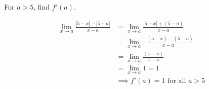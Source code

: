 \documentclass[nooutcomes]{ximera}
\renewenvironment{freeResponse}{
\ifhandout\setbox0\vbox\bgroup\else
\begin{trivlist}\item[\hskip \labelsep\bfseries Solution:\hspace{2ex}]
\fi}
{\ifhandout\egroup\else
\end{trivlist}
\fi}
\begin{document}
\begin{problem}
\begin{itemize}
    \item[(c)]
      For $a > 5$, find $f'(a)$.
      \begin{freeResponse}
        \begin{align*}
          \lim_{x \to a} \frac{|5-x| - |5-a|}{x - a}
          &= \lim_{x \to a} \frac{|5-x| + (5-a)}{x - a} \\
          &= \lim_{x \to a} \frac{-(5-x) - (5-a)}{x - a} \\
          &= \lim_{x \to a} \frac{(x-a)}{x-a}  \\
          &= \lim_{x \to a} 1 = 1\\
          &\implies \mbox{$f'(a) = 1$ for all $a > 5$}
        \end{align*}
      \end{freeResponse}

  \end{itemize}

\end{problem}
\end{document}
